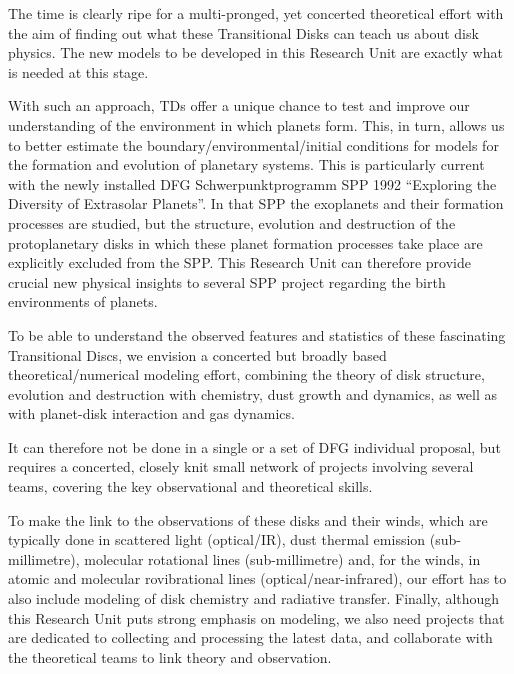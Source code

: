\documentclass[10pt,fleqn,twoside,a4paper]{article}
\begin{document}
The time is clearly ripe for a multi-pronged, yet concerted theoretical
effort with the aim of finding out what these Transitional Disks can teach
us about disk physics. The new models to be developed in this Research Unit are exactly
what is needed at this stage.

With such an approach, TDs offer a unique chance to test and improve our
understanding of the environment in which planets form.  This, in turn,
allows us to better estimate the boundary/environmental/initial conditions
for models for the formation and evolution of planetary systems. This is
particularly current with the newly installed DFG Schwerpunktprogramm SPP
1992 ``Exploring the Diversity of Extrasolar Planets''. In that SPP the
exoplanets and their formation processes are studied, but the structure,
evolution and destruction of the protoplanetary disks in which these planet
formation processes take place are explicitly excluded from the SPP. This
Research Unit can therefore provide crucial new physical insights to several
SPP project regarding the birth environments of planets.

%  
  
To be able to understand the observed features and statistics of these
fascinating Transitional Discs, we envision a concerted but broadly based
theoretical/numerical modeling effort, combining the theory of disk
structure, evolution and destruction with chemistry, dust growth and
dynamics, as well as with planet-disk interaction and gas dynamics.

\begin{highlight}
  It can therefore not be done in a single or a set of DFG individual
  proposal, but requires a concerted, closely knit small network of projects
  involving several teams, covering the key observational and theoretical
  skills.
\end{highlight}

To make the link to the observations of these disks and their winds, which
are typically done in scattered light (optical/IR), dust thermal emission
(sub-millimetre), molecular rotational lines (sub-millimetre) and, for the
winds, in atomic and molecular rovibrational lines (optical/near-infrared),
our effort has to also include modeling of disk chemistry and radiative
transfer. Finally, although this Research Unit puts strong emphasis on
modeling, we also need projects that are dedicated to collecting and
processing the latest data, and collaborate with the theoretical teams to
link theory and observation.
%
\end{document}

